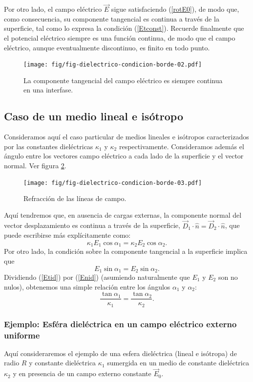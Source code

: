Por otro lado, el campo eléctrico $\vec{E}$ sigue satisfaciendo (\ref{rotE0}),
de modo que, como consecuencia, su componente tangencial es continua a través
de la superficie, tal como lo expresa la condición (\ref{Etconst}). Recuerde
finalmente que el potencial eléctrico siempre es una función continua, de
modo que el campo eléctrico, aunque eventualmente discontinuo, es finito en
todo punto.
\begin{figure}[!h]
\centerline{\texttt{[image: fig/fig-dielectrico-condicion-borde-02.pdf]}}
\caption{La componente tangencial del campo eléctrico es siempre continua
en una interfase.}
\label{CF2}
\end{figure}

\subsection{Caso de un medio lineal e isótropo}

Consideramos aquí el caso particular de medios lineales e isótropos caracterizados por las constantes dieléctricas $\kappa_1$ y $\kappa_2$ respectivamente. Consideramos además el ángulo entre los vectores campo eléctrico a cada lado de la superficie y el vector normal. Ver figura \ref{CF3}. 
\begin{figure}[!h]
\centerline{\texttt{[image: fig/fig-dielectrico-condicion-borde-03.pdf]}}
\caption{Refracción de las líneas de campo.}
\label{CF3}
\end{figure}
Aquí tendremos que, en ausencia de cargas externas, la componente normal del vector desplazamiento es continua a través de la superficie,  $\vec{D}_1\cdot\hat{n}=\vec{D}_2\cdot\hat{n}$, que puede escribirse más explícitamente como:
\begin{equation}\label{Enid}
\kappa_1 E_1\cos\alpha_1=\kappa_2E_2\cos\alpha_2.
\end{equation}
Por otro lado, la condición sobre la componente tangencial a la superficie implica que
\begin{equation} \label{Etid}
 E_1\sin\alpha_1=E_2\sin\alpha_2.
\end{equation}
Dividiendo (\ref{Etid}) por (\ref{Enid}) (asumiendo naturalmente que $E_1$ y $E_2$ son no nulos), obtenemos una simple relación entre los ángulos $\alpha_1$ y $\alpha_2$:
\begin{equation}
 \frac{\tan\alpha_1}{\kappa_1}=\frac{\tan\alpha_2}{\kappa_2}.
\end{equation}

\subsubsection{Ejemplo: Esféra dieléctrica en un campo eléctrico externo uniforme}
Aquí consideraremos el ejemplo de una esfera dieléctrica (lineal e isótropa) de radio $R$ y constante dieléctrica $\kappa_1$ sumergida en un medio de constante dieléctrica $\kappa_2$ y en presencia de un campo externo constante $\vec{E}_0$.

